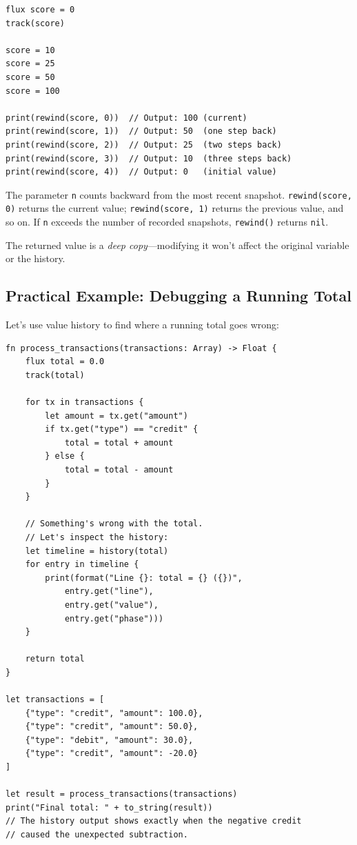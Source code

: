 \begin{lstlisting}[language=Lattice, caption={Rewinding variable state}]
flux score = 0
track(score)

score = 10
score = 25
score = 50
score = 100

print(rewind(score, 0))  // Output: 100 (current)
print(rewind(score, 1))  // Output: 50  (one step back)
print(rewind(score, 2))  // Output: 25  (two steps back)
print(rewind(score, 3))  // Output: 10  (three steps back)
print(rewind(score, 4))  // Output: 0   (initial value)
\end{lstlisting}

The parameter \lstinline|n| counts backward from the most recent snapshot.
\lstinline|rewind(score, 0)| returns the current value; \lstinline|rewind(score, 1)| returns the previous value, and so on.
If \lstinline|n| exceeds the number of recorded snapshots, \lstinline|rewind()| returns \lstinline|nil|.

The returned value is a \emph{deep copy}---modifying it won't affect the original variable or the history.

\subsection{Practical Example: Debugging a Running Total}\label{sec:history-example}

Let's use value history to find where a running total goes wrong:

\begin{lstlisting}[language=Lattice, caption={Debugging with value history}]
fn process_transactions(transactions: Array) -> Float {
    flux total = 0.0
    track(total)

    for tx in transactions {
        let amount = tx.get("amount")
        if tx.get("type") == "credit" {
            total = total + amount
        } else {
            total = total - amount
        }
    }

    // Something's wrong with the total.
    // Let's inspect the history:
    let timeline = history(total)
    for entry in timeline {
        print(format("Line {}: total = {} ({})",
            entry.get("line"),
            entry.get("value"),
            entry.get("phase")))
    }

    return total
}

let transactions = [
    {"type": "credit", "amount": 100.0},
    {"type": "credit", "amount": 50.0},
    {"type": "debit", "amount": 30.0},
    {"type": "credit", "amount": -20.0}
]

let result = process_transactions(transactions)
print("Final total: " + to_string(result))
// The history output shows exactly when the negative credit
// caused the unexpected subtraction.
\end{lstlisting}

